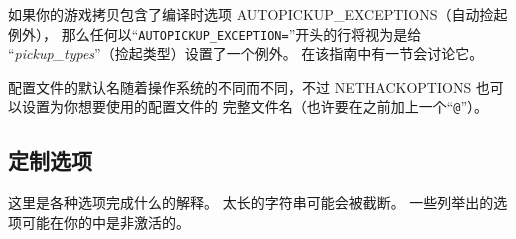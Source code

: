 \documentclass[a4paper, 10pt]{article}
\begin{document}
如果你的游戏拷贝包含了编译时选项 AUTOPICKUP\_EXCEPTIONS（自动捡起例外），
那么任何以“{\tt AUTOPICKUP\_EXCEPTION=}”开头的行将视为是给
“{\it pickup\_types}”（捡起类型）设置了一个例外。
在该指南中有一节会讨论它。

配置文件的默认名随着操作系统的不同而不同，不过
NETHACKOPTIONS 也可以设置为你想要使用的配置文件的
完整文件名（也许要在之前加上一个“{\tt @}”）。

\subsection*{定制选项}

这里是各种选项完成什么的解释。
太长的字符串可能会被截断。
一些列举出的选项可能在你的\zhTransDungeon{}中是非激活的。
\end{document}
